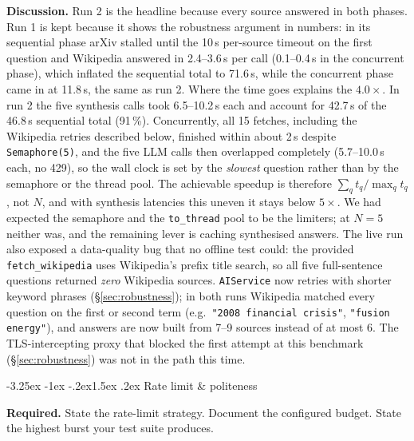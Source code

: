 \documentclass[11pt,a4paper]{article}
\makeatletter
\renewcommand\subsection{\@startsection{subsection}{2}{\z@}%
    {-3.25ex \@plus -1ex \@minus -.2ex}{1.5ex \@plus .2ex}%
    {\normalfont\large\bfseries\color{accent}}}%
\makeatother
\begin{document}
\textbf{Discussion.} Run 2 is the headline because every source answered in both phases. Run 1 is kept because it shows the robustness argument in numbers: in its sequential phase arXiv stalled until the 10\,s per-source timeout on the first question and Wikipedia answered in 2.4--3.6\,s per call (0.1--0.4\,s in the concurrent phase), which inflated the sequential total to 71.6\,s, while the concurrent phase came in at 11.8\,s, the same as run 2. Where the time goes explains the $4.0\times$. In run 2 the five synthesis calls took 6.5--10.2\,s each and account for 42.7\,s of the 46.8\,s sequential total (91\,\%). Concurrently, all 15 fetches, including the Wikipedia retries described below, finished within about 2\,s despite \texttt{Semaphore(5)}, and the five LLM calls then overlapped completely (5.7--10.0\,s each, no 429), so the wall clock is set by the \emph{slowest} question rather than by the semaphore or the thread pool. The achievable speedup is therefore $\sum_q t_q / \max_q t_q$, not $N$, and with synthesis latencies this uneven it stays below $5\times$. We had expected the semaphore and the \texttt{to\_thread} pool to be the limiters; at $N=5$ neither was, and the remaining lever is caching synthesised answers. The live run also exposed a data-quality bug that no offline test could: the provided \texttt{fetch\_wikipedia} uses Wikipedia's prefix title search, so all five full-sentence questions returned \emph{zero} Wikipedia sources. \texttt{AIService} now retries with shorter keyword phrases (\S\ref{sec:robustness}); in both runs Wikipedia matched every question on the first or second term (e.g.\ \texttt{"2008 financial crisis"}, \texttt{"fusion energy"}), and answers are now built from 7--9 sources instead of at most 6. The TLS-intercepting proxy that blocked the first attempt at this benchmark (\S\ref{sec:robustness}) was not in the path this time.

\subsection{Rate limit \& politeness}

\begin{deliverbox}
\textbf{Required.} State the rate-limit strategy. Document the configured budget. State the highest burst your test suite produces.
\end{deliverbox}
\end{document}
